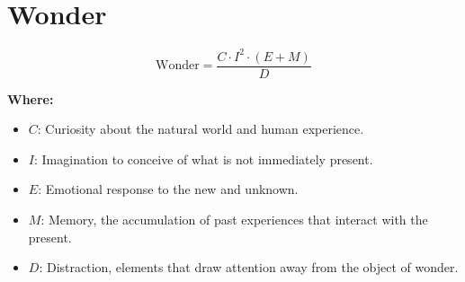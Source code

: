 \chapter{Wonder}

\begin{equation}
\text{Wonder} = \frac{C \cdot I^2 \cdot (E + M)}{D}
\end{equation}

\textbf{Where:}

\begin{itemize}
    \item $C$: Curiosity about the natural world and human experience.
    \item $I$: Imagination to conceive of what is not immediately present.
    \item $E$: Emotional response to the new and unknown.
    \item $M$: Memory, the accumulation of past experiences that interact with the present.
    \item $D$: Distraction, elements that draw attention away from the object of wonder.
\end{itemize}